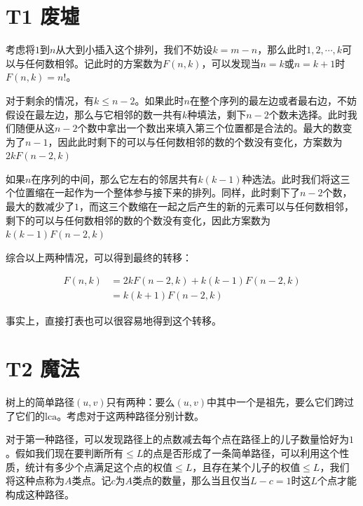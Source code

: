 \documentclass[12pt]{article}
\date{}
\begin{document}
\pagestyle{main}

\section{T1 废墟}

考虑将$1$到$n$从大到小插入这个排列，我们不妨设$k = m - n$，那么此时$1, 2, \cdots, k$可以与任何数相邻。记此时的方案数为$F(n, k)$，可以发现当$n = k$或$n = k + 1$时$F(n, k) = n!$。\par
对于剩余的情况，有$k\leq n - 2$。如果此时$n$在整个序列的最左边或者最右边，不妨假设在最左边，那么与它相邻的数一共有$k$种填法，剩下$n - 2$个数未选择。此时我们随便从这$n - 2$个数中拿出一个数出来填入第三个位置都是合法的。最大的数变为了$n - 1$，因此此时剩下的可以与任何数相邻的数的个数没有变化，方案数为$2kF(n - 2, k)$\par
如果$n$在序列的中间，那么它左右的邻居共有$k(k - 1)$种选法。此时我们将这三个位置缩在一起作为一个整体参与接下来的排列。同样，此时剩下了$n - 2$个数，最大的数减少了$1$，而这三个数缩在一起之后产生的新的元素可以与任何数相邻，剩下的可以与任何数相邻的数的个数没有变化，因此方案数为$k(k - 1)F(n - 2, k)$\par
综合以上两种情况，可以得到最终的转移：

$$\begin{aligned}
    F(n, k) &= 2kF(n - 2, k) + k(k - 1)F(n - 2, k) \\
    &= k(k + 1)F(n - 2, k) 
\end{aligned}$$

事实上，直接打表也可以很容易地得到这个转移。

\newpage

\section{T2 魔法}

树上的简单路径$(u, v)$只有两种：要么$(u, v)$中其中一个是祖先，要么它们跨过了它们的$\mathrm{lca}$。考虑对于这两种路径分别计数。\par
对于第一种路径，可以发现路径上的点数减去每个点在路径上的儿子数量恰好为$1$。假如我们现在要判断所有$\leq L$的点是否形成了一条简单路径，可以利用这个性质，统计有多少个点满足这个点的权值$\leq L$，且存在某个儿子的权值$\leq L$，我们将这种点称为$A$类点。记$c$为$A$类点的数量，那么当且仅当$L - c = 1$时这$L$个点才能构成这种路径。
\end{document}
